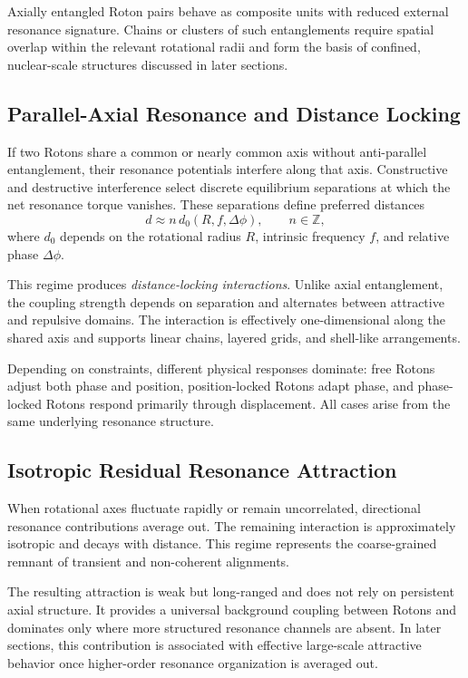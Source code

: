 \documentclass[11pt,a4paper]{article}
\begin{document}
Axially entangled Roton pairs behave as composite units with reduced external resonance signature.
Chains or clusters of such entanglements require spatial overlap within the relevant rotational
radii and form the basis of confined, nuclear-scale structures discussed in later sections.

\subsection{Parallel-Axial Resonance and Distance Locking}

If two Rotons share a common or nearly common axis without anti-parallel entanglement, their
resonance potentials interfere along that axis.
Constructive and destructive interference select discrete equilibrium separations at which the
net resonance torque vanishes.
These separations define preferred distances
\[
d \approx n\,d_0(R,f,\Delta\phi), \qquad n \in \mathbb{Z},
\]
where $d_0$ depends on the rotational radius $R$, intrinsic frequency $f$, and relative phase
$\Delta\phi$.

This regime produces \emph{distance-locking interactions}.
Unlike axial entanglement, the coupling strength depends on separation and alternates between
attractive and repulsive domains.
The interaction is effectively one-dimensional along the shared axis and supports linear chains,
layered grids, and shell-like arrangements.

Depending on constraints, different physical responses dominate:
free Rotons adjust both phase and position, position-locked Rotons adapt phase, and phase-locked
Rotons respond primarily through displacement.
All cases arise from the same underlying resonance structure.

\subsection{Isotropic Residual Resonance Attraction}

When rotational axes fluctuate rapidly or remain uncorrelated, directional resonance contributions
average out.
The remaining interaction is approximately isotropic and decays with distance.
This regime represents the coarse-grained remnant of transient and non-coherent alignments.

The resulting attraction is weak but long-ranged and does not rely on persistent axial structure.
It provides a universal background coupling between Rotons and dominates only where more
structured resonance channels are absent.
In later sections, this contribution is associated with effective large-scale attractive behavior
once higher-order resonance organization is averaged out.
\end{document}

